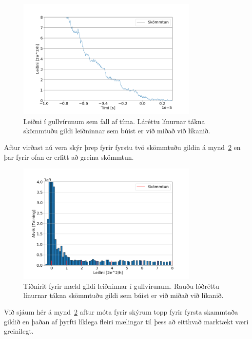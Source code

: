 \documentclass[11pt]{article}
\begin{document}
\begin{figure}[H]
    \centering
    \includegraphics[width=0.8\textwidth]{gull-leidni.png}
    \caption{Leiðni í gullvírunum sem fall af tíma. Láréttu línurnar tákna skömmtuðu gildi leiðninnar sem búist er við miðað við líkanið.}
    \label{fig:gull_leidni}
\end{figure}

Aftur virðast nú vera skýr þrep fyrir fyrstu tvö skömmtuðu gildin á mynd~\ref{fig:gull_hist_leidni} en þar fyrir ofan er erfitt að greina skömmtun. 

\begin{figure}[H]
    \centering
    \includegraphics[width=0.8\textwidth]{gull-hist-leidni.png}
    \caption{Tíðnirit fyrir mæld gildi leiðninnar í gullvírunum. Rauðu lóðréttu línurnar tákna skömmtuðu gildi sem búist er við miðað við líkanið.} 
    \label{fig:gull_hist_leidni}
\end{figure}

Við sjáum hér á mynd~\ref{fig:gull_hist_leidni} aftur móta fyrir skýrum topp fyrir fyrsta skammtaða gildið en þaðan af þyrfti líklega fleiri mælingar til þess að eitthvað marktækt væri greinilegt. 
\end{document}
